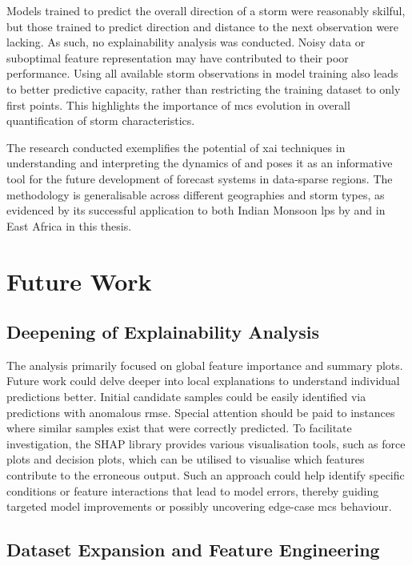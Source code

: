 Models trained to predict the overall direction of a storm were reasonably skilful, but those trained to predict direction and distance to the next observation were lacking. As such, no explainability analysis was conducted. Noisy data or suboptimal feature representation may have contributed to their poor performance. Using all available storm observations in model training also leads to better predictive capacity, rather than restricting the training dataset to only first points. This highlights the importance of \acrshort{mcs} evolution in overall quantification of storm characteristics.

The research conducted exemplifies the potential of \acrshort{xai} techniques in understanding and interpreting the dynamics of  and poses it as an informative tool for the future development of forecast systems in data-sparse regions. The methodology is generalisable across different geographies and storm types, as evidenced by its successful application to both Indian Monsoon \acrlong{lps} by \cite{Hunt2024} and  in East Africa in this thesis.

\section{Future Work}
\label{sec:future-work}

\subsection{Deepening of Explainability Analysis}


The analysis primarily focused on global feature importance and summary plots. Future work could delve deeper into local explanations to understand individual predictions better. Initial candidate samples could be easily identified via predictions with anomalous \acrshort{rmse}. Special attention should be paid to instances where similar samples exist that were correctly predicted. To facilitate investigation, the SHAP library provides various visualisation tools, such as force plots and decision plots, which can be utilised to visualise which features contribute to the erroneous output. Such an approach could help identify specific conditions or feature interactions that lead to model errors, thereby guiding targeted model improvements or possibly uncovering edge-case \acrshort{mcs} behaviour.

\subsection{Dataset Expansion and Feature Engineering}

